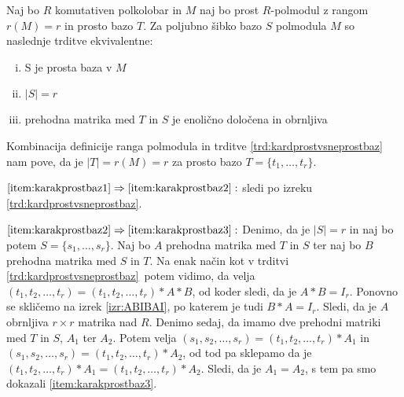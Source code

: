 \documentclass[mat1]{fmfdelo}
\newcommand{\abs}[1]{\ensuremath{\lvert #1 \rvert}}
\begin{document}
\begin{izrek}\label{izr:karakprostbaz}
Naj bo $R$ komutativen polkolobar in $M$ naj bo prost $R$-polmodul z rangom $r(M) = r$ in prosto bazo $T$. Za poljubno šibko bazo $S$ polmodula $M$ so naslednje trditve ekvivalentne: \begin{enumerate}[i.]
	\item\label{item:karakprostbaz1} S je prosta baza v $M$
	\item\label{item:karakprostbaz2} $\abs{S} = r$
	\item\label{item:karakprostbaz3} prehodna matrika med $T$ in $S$ je enolično določena in obrnljiva
\end{enumerate}
\end{izrek}
\begin{dokaz}
Kombinacija definicije ranga polmodula in trditve \ref{trd:kardprostvsneprostbaz} nam pove, da je $\abs{T} = r(M) = r$ za prosto bazo $T = \{t_1, \ldots, t_r\}$.

$\ref{item:karakprostbaz1}\Rightarrow \ref{item:karakprostbaz2}:$ sledi po izreku \ref{trd:kardprostvsneprostbaz}.

$\ref{item:karakprostbaz2}\Rightarrow \ref{item:karakprostbaz3}:$ Denimo, da je $\abs{S} = r$ in naj bo potem $S = \{s_1, \ldots, s_r\}$. Naj bo $A$ prehodna matrika med $T$ in $S$ ter naj bo $B$ prehodna matrika med $S$ in $T$. Na enak način kot v trditvi \ref{trd:kardprostvsneprostbaz}~potem vidimo, da velja $(t_1, t_2, \ldots, t_r) = (t_1, t_2, \ldots, t_r)*A*B$, od koder sledi, da je $A*B = I_r$. Ponovno se skličemo na izrek \ref{izr:ABIBAI}, po katerem je tudi $B*A = I_r$. Sledi, da je $A$ obrnljiva $r\times r$ matrika nad $R$. Denimo sedaj, da imamo dve prehodni matriki med $T$ in $S$, $A_1$ ter $A_2$. Potem velja $(s_1, s_2, \ldots, s_r) = (t_1, t_2, \ldots, t_r)*A_1$ in $(s_1, s_2, \ldots, s_r) = (t_1, t_2, \ldots, t_r)*A_2$, od tod pa sklepamo da je $(t_1, t_2, \ldots, t_r)*A_1 = (t_1, t_2, \ldots, t_r)*A_2$. Sledi, da je $A_1 = A_2$, s tem pa smo dokazali \ref{item:karakprostbaz3}.


\end{dokaz}
\end{document}
